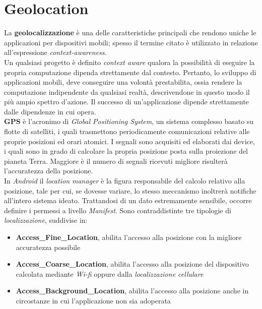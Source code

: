 \documentclass{article}
\begin{document}
\pagestyle{empty}

\section*{Geolocation}
\large
La \textbf{geolocalizzazione} è una delle caratteristiche principali che rendono uniche le applicazioni per dispositivi mobili; spesso il termine citato è utilizzato in relazione all'espressione \textit{context-awareness}.\vspace*{7pt}\\
Un qualsiasi progetto è definito \textit{context aware} qualora la possibilità di eseguire la propria computazione dipenda strettamente dal contesto. Pertanto, lo sviluppo di applicazioni mobili, deve conseguire una volontà prestabilita, ossia rendere la computazione indipendente da qualsiasi realtà, descrivendone in questo modo il più ampio spettro d'azione. Il successo di un'applicazione dipende strettamente dalle dipendenze in cui opera.\vspace*{7pt}\\
\textbf{GPS} è l'acronimo di \textit{Global Positioning System}, un sistema complesso basato su flotte di satelliti, i quali trasmettono periodicamente comunicazioni relative alle proprie posizioni ed orari atomici. I segnali sono acquisiti ed elaborati dai device, i quali sono in grado di calcolare la propria posizione posta sulla proiezione del pianeta Terra. Maggiore è il numero di segnali ricevuti migliore risulterà l'accuratezza della posizione.\vspace*{7pt}\\
In \textit{Android} il \textit{location manager} è la figura responsabile del calcolo relativo alla posizione, tale per cui, se dovesse variare, lo stesso meccanismo inoltrerà notifiche all'intero sistema ideato. Trattandosi di un dato estremamente sensibile, occorre definire i permessi a livello \textit{Manifest}. Sono contraddistinte tre tipologie di \textit{localizzazione}, suddivise in:
\begin{itemize}[label={-}]
  \itemsep0em
  \item \textbf{Access\_Fine\_Location}, abilita l'accesso alla posizione con la migliore accuratezza possibile
  \item \textbf{Access\_Coarse\_Location}, abilita l'accesso alla posizione del dispositivo calcolata mediante \textit{Wi-fi} oppure dalla \textit{localizzazione cellulare}
  \item \textbf{Access\_Background\_Location}, abilita l'accesso alla posizione anche in circostanze in cui l'applicazione non sia adoperata
\end{itemize}
\end{document}
